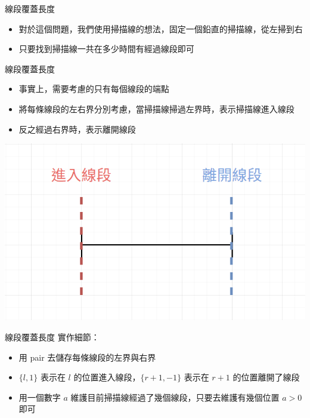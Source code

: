 \documentclass[aspectratio=169]{beamer}
\begin{document}
    \begin{frame}{線段覆蓋長度}
        \begin{itemize}
            \item 對於這個問題，我們使用掃描線的想法，固定一個鉛直的掃描線，從左掃到右
            \item 只要找到掃描線一共在多少時間有經過線段即可
        \end{itemize}
    \end{frame}
    
    \begin{frame}{線段覆蓋長度}
        \begin{itemize}
            \item 事實上，需要考慮的只有每個線段的端點
            \item 將每條線段的左右界分別考慮，當掃描線掃過左界時，表示掃描線進入線段
            \item 反之經過右界時，表示離開線段
        \end{itemize}
        \begin{center}
            \includegraphics[scale=0.4]{images/sweep_line_2.png}
        \end{center}
    \end{frame}
    
    \begin{frame}{線段覆蓋長度}
        實作細節：
        \begin{itemize}
            \item 用 pair 去儲存每條線段的左界與右界
            \item  $\{l,1\}$ 表示在 $l$ 的位置進入線段，$\{r+1,-1\}$ 表示在 $r+1$ 的位置離開了線段
            \item 用一個數字 $a$ 維護目前掃描線經過了幾個線段，只要去維護有幾個位置 $a > 0$ 即可
        \end{itemize}
    \end{frame}
    
\end{document}
